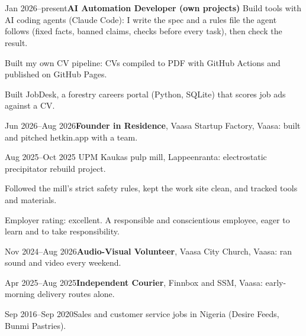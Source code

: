 \documentclass[a4paper,11pt]{article}
\begin{document}
\section{}

\section{}
\begin{cventry}{Jan 2026--present}{\textbf{AI Automation Developer (own projects)}}
  Build tools with AI coding agents (Claude Code): I write the spec and a rules file the agent follows (fixed facts, banned claims, checks before every task), then check the result.\par
  Built my own CV pipeline: CVs compiled to PDF with GitHub Actions and published on GitHub Pages.\par
  Built JobDesk, a forestry careers portal (Python, SQLite) that scores job ads against a CV.
\end{cventry}
\begin{cventry}{Jun 2026--Aug 2026}{\textbf{Founder in Residence}, Vaasa Startup Factory, Vaasa: built and pitched hetkin.app with a team.}
\end{cventry}
\begin{cventry}{Aug 2025--Oct 2025}{}
  UPM Kaukas pulp mill, Lappeenranta: electrostatic precipitator rebuild project.\par
  Followed the mill's strict safety rules, kept the work site clean, and tracked tools and materials.\par
  Employer rating: excellent. A responsible and conscientious employee, eager to learn and to take responsibility.
\end{cventry}
\begin{cventry}{Nov 2024--Aug 2026}{\textbf{Audio-Visual Volunteer}, Vaasa City Church, Vaasa: ran sound and video every weekend.}
\end{cventry}
\begin{cventry}{Apr 2025--Aug 2025}{\textbf{Independent Courier}, Finnbox and SSM, Vaasa: early-morning delivery routes alone.}
\end{cventry}
\begin{cventry}{Sep 2016--Sep 2020}{Sales and customer service jobs in Nigeria (Desire Feeds, Bunmi Pastries).}
\end{cventry}

\section{}
\end{document}
